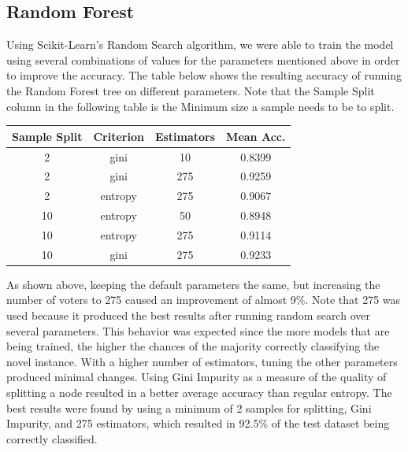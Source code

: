 \documentclass{article}
\begin{document}
        \subsection{Random Forest}
        Using Scikit-Learn’s Random Search algorithm, we were able to train the model using 
        several combinations of values for the parameters mentioned above in order to improve the 
        accuracy. The table below shows the resulting accuracy of running the Random Forest tree 
        on different parameters. Note that the Sample Split column in the following table is the 
        Minimum size a sample needs to be to split.
        \begin{center}
            \begin{tabular}{|c|c|c|c|}
                \hline
                Sample Split & Criterion & Estimators & Mean Acc. \\
                \hline
                2 & gini & 10 & 0.8399 \\
                2 & gini & 275 & 0.9259 \\
                2 & entropy & 275 & 0.9067 \\
                10 & entropy & 50 & 0.8948 \\
                10 & entropy & 275 & 0.9114 \\
                10 & gini & 275 & 0.9233 \\
                \hline
            \end{tabular}
        \end{center}
        As shown above, keeping the default parameters the same, but increasing the number of 
        voters to 275 caused an improvement of almost 9\%. Note that 275 was used because it 
        produced the best results after running random search over several parameters. This 
        behavior was expected since the more models that are being trained, the higher the chances 
        of the majority correctly classifying the novel instance. With a higher number of 
        estimators, tuning the other parameters produced minimal changes. Using Gini Impurity as a 
        measure of the quality of splitting a node resulted in a better average accuracy than 
        regular entropy. The best results were found by using a minimum of 2 samples for 
        splitting, Gini Impurity, and 275 estimators, which resulted in 92.5\% of the test dataset 
        being correctly classified.
\end{document}
